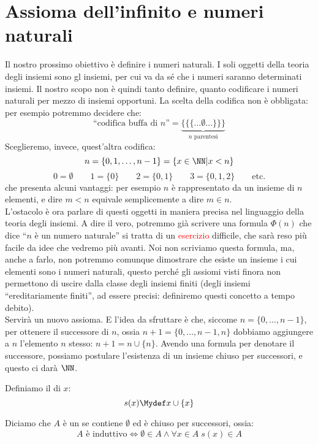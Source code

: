 \documentclass[11pt]{scrartcl}
\begin{document}
\section{Assioma dell'infinito e numeri naturali}
Il nostro prossimo obiettivo è definire i numeri naturali. I soli oggetti della teoria degli insiemi sono gl insiemi, per cui va da sé che 
i numeri saranno determinati insiemi. Il nostro scopo non è quindi tanto definire, quanto codificare i numeri naturali per mezzo di insiemi opportuni.
La scelta della codifica non è obbligata: per esempio potremmo decidere che:
\[ \text{``codifica buffa di $n$''} = \underbrace{\{\{\{\ldots \emptyset\ldots\}\}\}}_{\text{$n$ parentesi}}
	\]
Sceglieremo, invece, quest'altra codifica:
\[ n = \{0,1,\ldots,n-1\} = \{x \in \NN | x < n\}
	\]\[ 0 = \emptyset \qquad 1 = \{0\} \qquad 2 = \{0,1\} \qquad 3 = \{0,1,2\} \qquad \text{etc.}
		\]
che presenta alcuni vantaggi: per esempio $n$ è rappresentato da un insieme di $n$ elementi, e dire $m < n$ equivale semplicemente a dire $m \in n$.\\
L'ostacolo è ora parlare di questi oggetti in maniera precisa nel linguaggio della teoria degli insiemi. A dire il vero, potremmo già scrivere una formula $\Phi(n)$ che dice 
``$n$ è un numero naturale'' si tratta di un \textcolor{red}{esercizio} difficile, che sarà reso più facile da idee che vedremo più avanti. Noi non scriviamo questa formula, ma, anche a farlo,
non potremmo comunque dimostrare che esiste un insieme i cui elementi sono i numeri naturali, questo perché gli assiomi visti finora non permettono di uscire dalla classe degli insiemi finiti (degli insiemi ``ereditariamente finiti'',
ad essere precisi: definiremo questi concetto a tempo debito).\\
Servirà un nuovo assioma. E l'idea da sfruttare è che, siccome $n = \{0,\ldots,n-1\}$, per ottenere il successore di $n$, ossia $n+1 = \{0,\ldots,n-1,n\}$ dobbiamo aggiungere a $n$ l'elemento $n$ stesso: $n+1 = n \cup \{n\}$.
Avendo una formula per denotare il successore, possiamo postulare l'esistenza di un insieme chiuso per successori, e questo ci darà $\NN$.

\begin{definition}
	[Successore]
	Definiamo il  di $x$:
	\[ s(x) \Mydef x \cup \{x\}
		\]
\end{definition}

\begin{definition}
	Diciamo che $A$ è un  se contiene $\emptyset$ ed è chiuso per successori, ossia:
	\[ \text{$A$ è induttivo} \iff \emptyset \in A \land \forall x \in A \; s(x) \in A
		\]
\end{definition}
\end{document}
